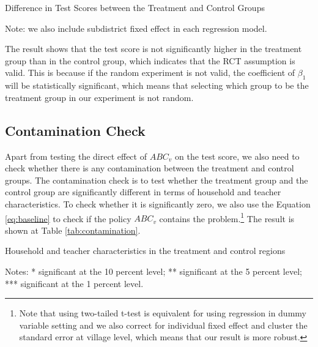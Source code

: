 \documentclass[12pt]{jfm}
\begin{document}
\begin{table}
  \begin{center}
    \begin{footnotesize}
    \caption{Difference in Test Scores between the Treatment and Control Groups}
    \label{tab:baseline}
    

    Note: we also include subdistrict fixed effect in each regression model.
    \end{footnotesize}
  \end{center}
\end{table}

The result shows that the test score is not significantly higher in the treatment group than in the control group, which indicates that the RCT assumption is valid. This is because if the random experiment is not valid, the coefficient of $\beta_1$ will be statistically significant, which means that selecting which group to be the treatment group in our experiment is not random.

\subsection{Contamination Check} \label{subsec:contamination}

Apart from testing the direct effect of $ABC_{v}$ on the test score, we also need to check whether there is any contamination between the treatment and control groups. The contamination check is to test whether the treatment group and the control group are significantly different in terms of household and teacher characteristics. To check whether it is significantly zero, we also use the Equation \eqref{eq:baseline} to check if the policy $ABC_{v}$ contains the problem.\footnote{Note that using two-tailed t-test is equivalent for using regression in dummy variable setting and we also correct for individual fixed effect and cluster the standard error at village level, which means that our result is more robust.} The result is shown at Table \ref{tab:contamination}.

\begin{table}
  \begin{center}
    \begin{footnotesize}
    \caption{Household and teacher characteristics in the treatment and control regions}
    \label{tab:contamination}
    

    Notes: * significant at the 10 percent level; ** significant at the 5 percent level; *** significant at the 1 percent level.
    \end{footnotesize}
  \end{center}
\end{table}
\end{document}
